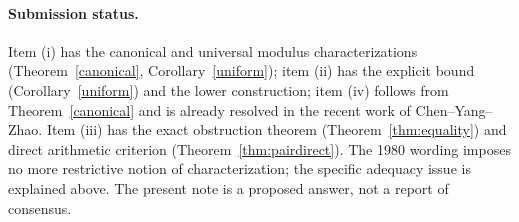 \documentclass[11pt]{article}
\theoremstyle{remark}\newtheorem{remark}[theorem]{Remark}
\begin{document}
\paragraph{Submission status.} Item (i) has the canonical and universal modulus characterizations (Theorem~\ref{canonical}, Corollary~\ref{uniform}); item (ii) has the explicit bound (Corollary~\ref{uniform}) and the lower construction; item (iv) follows from Theorem~\ref{canonical} and is already resolved in the recent work of Chen--Yang--Zhao. Item (iii) has the exact obstruction theorem (Theorem~\ref{thm:equality}) and direct arithmetic criterion (Theorem~\ref{thm:pairdirect}). The 1980 wording imposes no more restrictive notion of characterization; the specific adequacy issue is explained above. The present note is a proposed answer, not a report of consensus.\par
\end{document}
